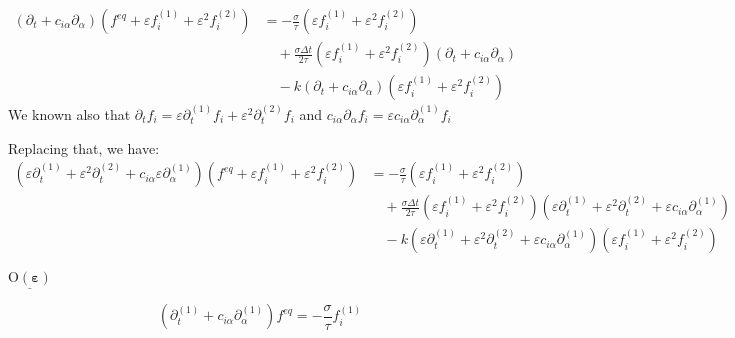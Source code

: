\documentclass{article}
\newcommand{\Omicron}{\mathrm{O}}
\begin{document}
\begin{equation}
    \begin{aligned}
        ( \partial _{t} + c_{i\alpha } \partial _{\alpha })\left( f^{eq} + \varepsilon f_{i}^{( 1)} + \varepsilon ^{2} f_{i}^{( 2)}\right) 
        &= -\frac{\sigma}{\tau }\left( \varepsilon f_{i}^{( 1)} + \varepsilon ^{2} f_{i}^{( 2)}\right) \\
        &\quad + \frac{\sigma \Delta t}{2 \tau }\left( \varepsilon f_{i}^{( 1)} + \varepsilon ^{2} f_{i}^{( 2)}\right)( \partial _{t} + c_{i\alpha } \partial _{\alpha }) \\
        &\quad - k( \partial _{t} + c_{i\alpha } \partial _{\alpha })\left( \varepsilon f_{i}^{( 1)} + \varepsilon ^{2} f_{i}^{( 2)}\right)
    \end{aligned}
\end{equation}
We known also that $\partial _{t} f_{i} = \varepsilon \partial _{t}^{( 1)} f_{i} +\varepsilon ^{2} \partial _{t}^{( 2)} f_{i}$
and $c_{i\alpha } \partial _{\alpha } f_{i} =\varepsilon c_{i\alpha } \partial _{\alpha }^{( 1)} f_{i}$

Replacing that, we have:
\begin{equation}
    \begin{aligned}
        \left( \varepsilon \partial_{t}^{(1)} + \varepsilon^{2} \partial_{t}^{(2)} + c_{i\alpha} \varepsilon \partial_{\alpha}^{(1)} \right) 
        \left( f^{eq} + \varepsilon f_{i}^{(1)} + \varepsilon^{2} f_{i}^{(2)} \right) 
        &= -\frac{\sigma}{\tau} \left( \varepsilon f_{i}^{(1)} + \varepsilon^{2} f_{i}^{(2)} \right) \\
        &\quad + \frac{\sigma \Delta t}{2\tau} \left( \varepsilon f_{i}^{(1)} + \varepsilon^{2} f_{i}^{(2)} \right) 
        \left( \varepsilon \partial_{t}^{(1)} + \varepsilon^{2} \partial_{t}^{(2)} + \varepsilon c_{i\alpha} \partial_{\alpha}^{(1)} \right) \\
        &\quad - k \left( \varepsilon \partial_{t}^{(1)} + \varepsilon^{2} \partial_{t}^{(2)} + \varepsilon c_{i\alpha} \partial_{\alpha}^{(1)} \right) 
        \left( \varepsilon f_{i}^{(1)} + \varepsilon^{2} f_{i}^{(2)} \right)
    \end{aligned}
\end{equation}

$\underline{\boldsymbol{\Omicron ( \varepsilon )}}$

\begin{equation*}
    \left( \partial _{t}^{( 1)} +c_{i\alpha } \partial _{\alpha }^{( 1)}\right) f^{eq} =-\frac{\sigma}{\tau } f_{i}^{( 1)}
\end{equation*}
\end{document}
